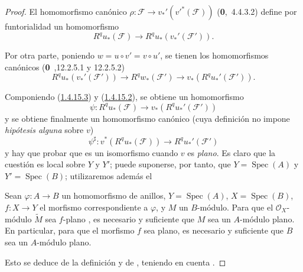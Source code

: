 \begin{proof}
El homomorfismo canónico
$\rho:\mathcal F\to v_*'(v'^*(\mathcal F))$ (\textbf{0},~4.4.3.2) define por funtorialidad un homomorfismo
\begin{equation}
\label{III.1.4.15.2-fr}
\tag{1.4.15.2}
R^qu_*(\mathcal F)\longrightarrow R^qu_*(v_*'(\mathcal F')).
\end{equation}

Por otra parte, poniendo $w=u\circ v'=v\circ u'$, se tienen los homomorfismos canónicos (\textbf{0}~,12.2.5.1 y 12.2.5.2)
\begin{equation}
\label{III.1.4.15.3-fr}
\tag{1.4.15.3}
R^qu_*(v_*'(\mathcal F'))\longrightarrow R^qw_*(\mathcal F')
\longrightarrow v_*(R^qu_*'(\mathcal F')).
\end{equation}

Componiendo (\hyperref[III.1.4.15.3]{1.4.15.3}) y (\hyperref[III.1.4.15.2]{1.4.15.2}), se obtiene un homomorfismo
\[
\psi:R^qu_*(\mathcal F)\longrightarrow v_*(R^qu_*'(\mathcal F'))
\]
y se obtiene finalmente un homomorfismo canónico (cuya definición no impone \emph{hipótesis alguna} sobre $v$)
\begin{equation}
\label{III.1.4.15.4-fr}
\tag{1.4.15.4}
\psi^\sharp:v^*(R^qu_*(\mathcal F))\longrightarrow R^qu_*'(\mathcal F')
\end{equation}
y hay que probar que es un isomorfismo cuando $v$ es \emph{plano}.
Es claro que la cuestión es local sobre $Y$ y $Y'$; puede suponerse, por tanto, que $Y=\operatorname{Spec}(A)$ y $Y'=\operatorname{Spec}(B)$; utilizaremos además el
\begin{lemma}[1.4.15.5]
\label{III.1.4.15.5-fr}
Sean $\varphi:A\to B$ un homomorfismo de anillos, $Y=\operatorname{Spec}(A)$, $X=\operatorname{Spec}(B)$, $f:X\to Y$ el morfismo correspondiente a $\varphi$, y $M$ un $B$-módulo.
Para que el $\mathcal O_X$-módulo $\widetilde M$ sea $f$-plano \textup{}, es necesario y suficiente que $M$ sea un $A$-módulo plano.
En particular, para que el morfismo $f$ sea plano, es necesario y suficiente que $B$ sea un $A$-módulo plano.
\end{lemma}

Esto se deduce de la definición  y de , teniendo en cuenta .


\end{proof}
